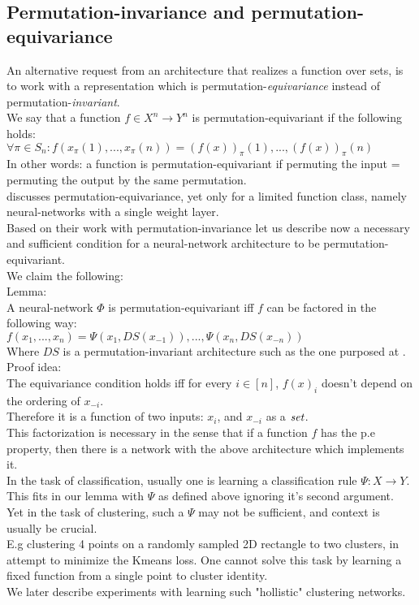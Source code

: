 \subsection{Permutation-invariance and permutation-equivariance}
An alternative request from an architecture that realizes a function over sets, is to work with a representation which is permutation-\textit{equivariance} instead of permutation-\textit{invariant}.\\
We say that a function $f\in X^n\rightarrow Y^n$ is permutation-equivariant if the following holds:\\
$\forall\pi\in S_n: f(x_\pi(1),...,x_\pi(n))=(f(x))_\pi(1),...,(f(x))_\pi(n)$\\
In other words: a function is permutation-equivariant if permuting the input = permuting the output by the same permutation. \\ 
\cite{zaheer17} discusses permutation-equivariance, yet only for a limited function class, namely neural-networks with a single weight layer.\\
Based on their work with permutation-invariance let us describe now a necessary and sufficient condition for a neural-network architecture to be permutation-equivariant.\\
We claim the following:\\
Lemma: \\
A neural-network $\Phi$ is permutation-equivariant iff $f$ can be factored in the following way:\\
$ f(x_1,...,x_n) = \Psi(x_1,DS(x_{-1})),...,\Psi(x_n,DS(x_{-n}))$\\
Where $DS$ is a permutation-invariant architecture such as the one purposed at \cite{zaheer17}.\\
Proof idea: \\
The equivariance condition holds iff for every $i\in[n]$, $f(x)_i$ doesn't depend on the ordering of $x_{-i}$. \\ Therefore it is a function of two inputs: $x_i$, and $x_{-i}$ as a $\it{set}$. \\
This factorization is necessary in the sense that if a function $f$ has the p.e property, then there is a network with the above architecture which implements it.\\ %
In the task of classification, usually one is learning a classification rule $\Psi:X\rightarrow Y$. This fits in our lemma with $\Psi$ as defined above ignoring it's second argument. \\
Yet in the task of clustering, such a $\Psi$ may not be sufficient, and context is usually be crucial. \\ E.g clustering 4 points on a randomly sampled 2D rectangle to two clusters, in attempt to minimize the Kmeans loss. One cannot solve this task by learning a fixed function from a single point to cluster identity.\\
We later describe experiments with learning such "hollistic" clustering networks. 